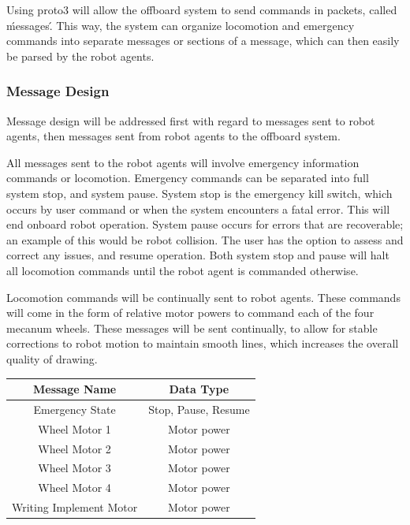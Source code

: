 Using proto3 will allow the offboard system to send commands in packets, called \'messages\'. This way, the system can organize locomotion and emergency commands into separate messages or sections of a message, which can then easily be parsed by the robot agents.

\subsubsection{Message Design}
\label{sec:software_comm_msg}
Message design will be addressed first with regard to messages sent to robot agents, then messages sent from robot agents to the offboard system.

All messages sent to the robot agents will involve emergency information commands or locomotion. Emergency commands can be separated into full system stop, and system pause. System stop is the emergency kill switch, which occurs by user command or when the system encounters a fatal error. This will end onboard robot operation. System pause occurs for errors that are recoverable; an example of this would be robot collision. The user has the option to assess and correct any issues, and resume operation. Both system stop and pause will halt all locomotion commands until the robot agent is commanded otherwise.

Locomotion commands will be continually sent to robot agents. These commands will come in the form of relative motor powers to command each of the four mecanum wheels. These messages will be sent continually, to allow for stable corrections to robot motion to maintain smooth lines, which increases the overall quality of drawing. 

\begin{center}
 \begin{tabular}{||c c ||}
 \hline
 Message Name & Data Type \\ [0.5ex]
 \hline\hline
 Emergency State & Stop, Pause, Resume \\
 \hline
 Wheel Motor 1 & Motor power \\
 \hline
 Wheel Motor 2 & Motor power \\
 \hline
 Wheel Motor 3 & Motor power \\
 \hline
 Wheel Motor 4 & Motor power \\
 \hline
 Writing Implement Motor & Motor power \\
 \hline
\end{tabular}
\end{center}

